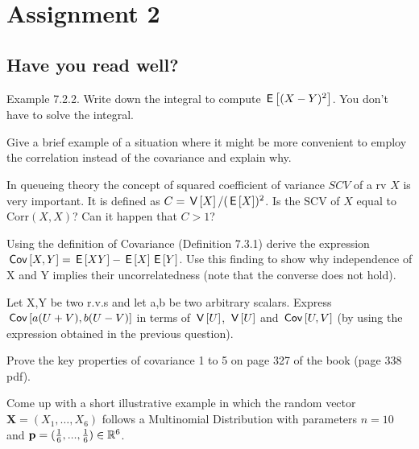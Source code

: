 \documentclass[assignments]{subfiles}
\begin{document}
\section{Assignment 2}


\subsection{Have you read well?}


\begin{exercise}
Example 7.2.2. Write down the integral to compute $\,\mathsf{E}\left[(X-Y)^{2}\right]$. You don't have to solve the integral.
\end{exercise}

\begin{exercise}
Give a brief example of a situation where it might be more convenient to employ the correlation instead of the covariance and explain why.
\end{exercise}

\begin{exercise}
In queueing theory  the concept of squared coefficient of variance $SCV$ of a rv $X$ is very important. It is defined as $C = \,\mathsf{V}\left[X\right]/(\,\mathsf{E}\left[X\right])^{2}$. Is the SCV of $X$ equal to $\text{Corr}(X,X)$? Can it happen that $C>1$?
\end{exercise}


\begin{exercise}
Using the definition of Covariance (Definition 7.3.1) derive the expression $\,\mathsf{Cov}\left[X,Y\right]=\,\mathsf{E}\left[XY\right]-\,\mathsf{E}\left[X\right]\,\mathsf{E}\left[Y\right]$. Use this finding to show why independence of X and Y implies their uncorrelatedness (note that the converse does not hold).
\end{exercise}

\begin{exercise}
Let X,Y be two r.v.s and let a,b be two arbitrary scalars. Express $\,\mathsf{Cov}\left[a(U+V), b(U-V)\right]$ in terms of  $\,\mathsf{V}\left[U\right]$, $\,\mathsf{V}\left[U\right]$ and $\,\mathsf{Cov}\left[U,V\right]$ (by using the expression obtained in the previous question).
\end{exercise}

\begin{exercise}
Prove the key properties of covariance 1 to 5 on page 327 of the book (page 338 pdf).
\end{exercise}

\begin{exercise}
Come up with a short illustrative example in which the random vector $\mathbf{X} = (X_1, \ldots, X_6)$ follows a Multinomial Distribution with parameters  $n=10$ and $\mathbf{p}=(\frac{1}{6}, ..., \frac{1}{6}) \in \mathbb{R}^{6}$.
\end{exercise}
\end{document}
